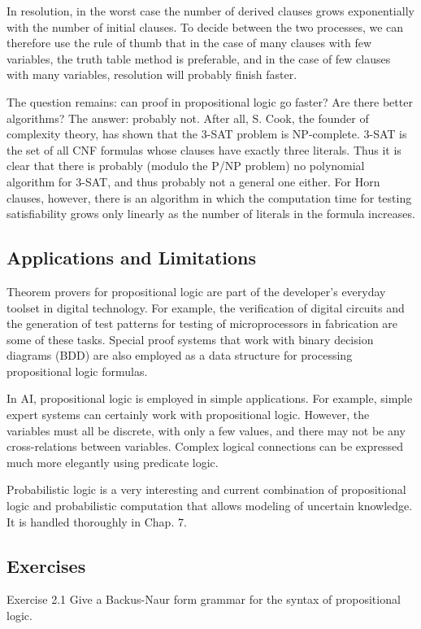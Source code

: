 \documentclass[10pt]{book}
\begin{document}
In resolution, in the worst case the number of derived clauses grows exponentially with the number of initial clauses. To decide between the two processes, we can therefore use the rule of thumb that in the case of many clauses with few variables, the truth table method is preferable, and in the case of few clauses with many variables, resolution will probably finish faster.

The question remains: can proof in propositional logic go faster? Are there better algorithms? The answer: probably not. After all, S. Cook, the founder of complexity theory, has shown that the 3-SAT problem is NP-complete. 3-SAT is the set of all CNF formulas whose clauses have exactly three literals. Thus it is clear that there is probably (modulo the P/NP problem) no polynomial algorithm for 3-SAT, and thus probably not a general one either. For Horn clauses, however, there is an algorithm in which the computation time for testing satisfiability grows only linearly as the number of literals in the formula increases.

\subsection*{Applications and Limitations}
Theorem provers for propositional logic are part of the developer's everyday toolset in digital technology. For example, the verification of digital circuits and the generation of test patterns for testing of microprocessors in fabrication are some of these tasks. Special proof systems that work with binary decision diagrams (BDD) are also employed as a data structure for processing propositional logic formulas.


In AI, propositional logic is employed in simple applications. For example, simple expert systems can certainly work with propositional logic. However, the variables must all be discrete, with only a few values, and there may not be any cross-relations between variables. Complex logical connections can be expressed much more elegantly using predicate logic.

Probabilistic logic is a very interesting and current combination of propositional logic and probabilistic computation that allows modeling of uncertain knowledge. It is handled thoroughly in Chap. 7.

\subsection*{Exercises}
Exercise 2.1 Give a Backus-Naur form grammar for the syntax of propositional logic.
\end{document}
